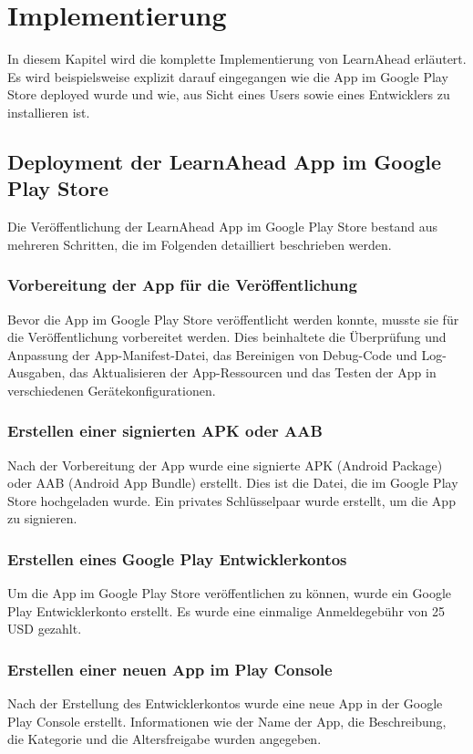 \section{Implementierung}
In diesem Kapitel wird die komplette Implementierung von LearnAhead erläutert. Es wird beispielsweise explizit darauf eingegangen wie die App im Google Play Store deployed wurde und wie, aus Sicht eines Users sowie eines Entwicklers zu installieren ist.\newline

\subsection{Deployment der LearnAhead App im Google Play Store}
Die Veröffentlichung der LearnAhead App im Google Play Store bestand aus mehreren Schritten, die im Folgenden detailliert beschrieben werden. \newline
\subsubsection{Vorbereitung der App für die Veröffentlichung}
Bevor die App im Google Play Store veröffentlicht werden konnte, musste sie für die Veröffentlichung vorbereitet werden. Dies beinhaltete die Überprüfung und Anpassung der App-Manifest-Datei, das Bereinigen von Debug-Code und Log-Ausgaben, das Aktualisieren der App-Ressourcen und das Testen der App in verschiedenen Gerätekonfigurationen.\newline
\subsubsection{Erstellen einer signierten APK oder AAB}
Nach der Vorbereitung der App wurde eine signierte APK (Android Package) oder AAB (Android App Bundle) erstellt. Dies ist die Datei, die im Google Play Store hochgeladen wurde. Ein privates Schlüsselpaar wurde erstellt, um die App zu signieren. \newline
\subsubsection{Erstellen eines Google Play Entwicklerkontos}
Um die App im Google Play Store veröffentlichen zu können, wurde ein Google Play Entwicklerkonto erstellt. Es wurde eine einmalige Anmeldegebühr von 25 USD gezahlt. \newline
\subsubsection{Erstellen einer neuen App im Play Console}
Nach der Erstellung des Entwicklerkontos wurde eine neue App in der Google Play Console erstellt. Informationen wie der Name der App, die Beschreibung, die Kategorie und die Altersfreigabe wurden angegeben.\newline
